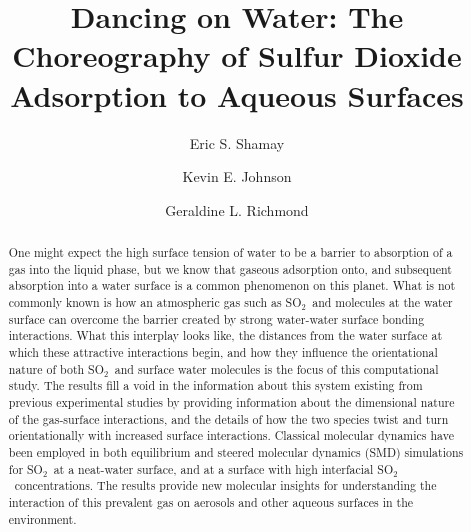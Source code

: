 \documentclass{article}
\title{Dancing on Water: The Choreography of Sulfur Dioxide Adsorption to Aqueous Surfaces}
\author{Eric S. Shamay \and Kevin E. Johnson \and Geraldine L. Richmond}
\begin{document}
\newcommand{\suldiox}{SO$_2$}
\newcommand{\ang}{\,$\textrm{\AA}$}
\newcommand{\angs}{\ang}
\newcommand{\wat}{H$_2$O}

\maketitle

\linenumbers 
\doublespacing


\begin{abstract}
One might expect the high surface tension of water to be a barrier to absorption of a gas into the liquid phase, but we know that gaseous adsorption onto, and subsequent absorption into a water surface is a common phenomenon on this planet.  What is not commonly known is how an atmospheric gas such as \suldiox~and molecules at the water surface can overcome the barrier created by strong water-water surface bonding interactions.  What this interplay looks like, the distances from the water surface at which these attractive interactions begin, and how they influence the orientational nature of both \suldiox~and surface water molecules is the focus of this computational study.  The results fill a void in the information about this system existing from previous experimental studies by providing information about the dimensional nature of the gas-surface interactions, and the details of how the two species twist and turn orientationally with increased surface interactions.  Classical molecular dynamics have been employed in both equilibrium and steered molecular dynamics (SMD) simulations for \suldiox~at a neat-water surface, and at a surface with high interfacial \suldiox~concentrations.  The results provide new molecular insights for understanding the interaction of this prevalent gas on aerosols and other aqueous surfaces in the environment.
\end{abstract}







\end{document}
